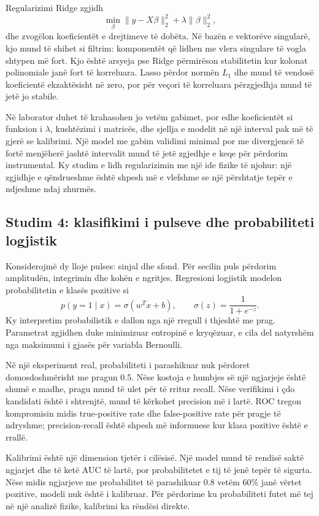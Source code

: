 \documentclass[12pt,a4paper,oneside]{book}
\begin{document}
Regularizimi Ridge zgjidh
\[
\min_\beta \|y-X\beta\|_2^2+\lambda\|\beta\|_2^2,
\]
dhe zvogëlon koeficientët e drejtimeve të dobëta. Në bazën e vektorëve singularë, kjo mund të shihet si filtrim: komponentët që lidhen me vlera singulare të vogla shtypen më fort. Kjo është arsyeja pse Ridge përmirëson stabilitetin kur kolonat polinomiale janë fort të korreluara. Lasso përdor normën $L_1$ dhe mund të vendosë koeficientë ekzaktësisht në zero, por për veçori të korreluara përzgjedhja mund të jetë jo stabile.

Në laborator duhet të krahasohen jo vetëm gabimet, por edhe koeficientët si funksion i $\lambda$, kushtëzimi i matricës, dhe sjellja e modelit në një interval pak më të gjerë se kalibrimi. Një model me gabim validimi minimal por me divergjencë të fortë menjëherë jashtë intervalit mund të jetë zgjedhje e keqe për përdorim instrumental. Ky studim e lidh regularizimin me një ide fizike të njohur: një zgjidhje e qëndrueshme është shpesh më e vlefshme se një përshtatje tepër e ndjeshme ndaj zhurmës.

\subsection*{Studim 4: klasifikimi i pulseve dhe probabiliteti logjistik}
Konsiderojmë dy lloje pulses: sinjal dhe sfond. Për secilin puls përdorim amplitudën, integrimin dhe kohën e ngritjes. Regresioni logjistik modelon probabilitetin e klasës pozitive si
\[
p(y=1\mid x)=\sigma(w^Tx+b),\qquad \sigma(z)=\frac1{1+e^{-z}}.
\]
Ky interpretim probabilistik e dallon nga një rregull i thjeshtë me prag. Parametrat zgjidhen duke minimizuar entropinë e kryqëzuar, e cila del natyrshëm nga maksimumi i gjasës për variabla Bernoulli.

Në një eksperiment real, probabiliteti i parashikuar nuk përdoret domosdoshmërisht me pragun 0.5. Nëse kostoja e humbjes së një ngjarjeje është shumë e madhe, pragu mund të ulet për të rritur recall. Nëse verifikimi i çdo kandidati është i shtrenjtë, mund të kërkohet precision më i lartë. ROC tregon kompromisin midis true-positive rate dhe false-positive rate për pragje të ndryshme; precision-recall është shpesh më informuese kur klasa pozitive është e rrallë.

Kalibrimi është një dimension tjetër i cilësisë. Një model mund të rendisë saktë ngjarjet dhe të ketë AUC të lartë, por probabilitetet e tij të jenë tepër të sigurta. Nëse midis ngjarjeve me probabilitet të parashikuar 0.8 vetëm 60\% janë vërtet pozitive, modeli nuk është i kalibruar. Për përdorime ku probabiliteti futet më tej në një analizë fizike, kalibrimi ka rëndësi direkte.
\end{document}
